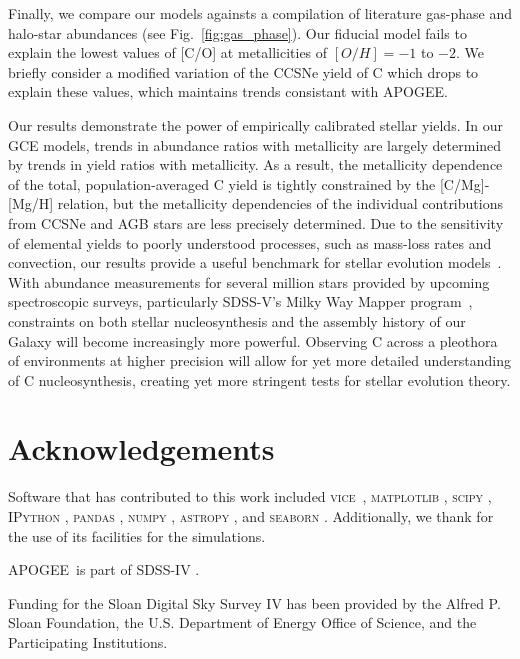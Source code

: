 \documentclass[fleqn,
referee, %
usenatbib]{mnras}
\newcommand{\VICE}{\textsc{vice}}
\newcommand{\apogee}{APOGEE}
\begin{document}
Finally, we compare our models againsts a compilation of literature gas-phase and halo-star abundances (see Fig.~\ref{fig:gas_phase}). Our fiducial model fails to explain the lowest values of [C/O] at metallicities of $[O/H] = -1$ to $-2$. We briefly consider a modified variation of the CCSNe yield of C which drops to explain these values, which maintains trends consistant with APOGEE. 


Our results demonstrate the power of empirically calibrated stellar yields. In our GCE models, trends in abundance ratios with metallicity are largely determined by trends in yield ratios with metallicity. As a result, the metallicity dependence of the total, population-averaged C yield is tightly constrained by the [C/Mg]-[Mg/H] relation, but the metallicity dependencies of the individual contributions from CCSNe and AGB stars are less precisely determined. Due to the sensitivity of elemental yields to poorly understood processes, such as mass-loss rates and convection, our results provide a useful benchmark for stellar evolution models~\citep[see the discussion in e.g.][]{gil-pons+2022}. With abundance measurements for several million stars provided by upcoming spectroscopic surveys, particularly SDSS-V's Milky Way Mapper program~\citep{sdssv}, constraints on both stellar nucleosynthesis and the assembly history of our Galaxy will become increasingly more powerful.
Observing C across a pleothora of environments at higher precision will allow for yet more detailed understanding of C nucleosynthesis, creating yet more stringent tests for stellar evolution theory.


\section*{Acknowledgements}

Software that has contributed to this work included  
\VICE~\citep{JW20, james+21},
\textsc{matplotlib} \citep{matplotlib},
\textsc{scipy} \citep{scipy},
\textsc{IPython} \citep{ipy},
\textsc{pandas} \citep{pandas},
\textsc{numpy} \citep{numpy},
\textsc{astropy} \citep{astropy:2013, astropy:2018, astropy:2022},
and 
\textsc{seaborn} \citep{seaborn}
.
Additionally, we thank \citet{OhioSupercomputerCenter1987} for the use of its facilities for the simulations. 

\apogee\ is part of SDSS-IV \citep{sloan_telescope, apogee_instrumentation, sdss_iv_overview, sdss17, apogee17, aspcap}.

Funding for the Sloan Digital Sky 
Survey IV has been provided by the 
Alfred P. Sloan Foundation, the U.S. 
Department of Energy Office of 
Science, and the Participating 
Institutions. 
\end{document}
